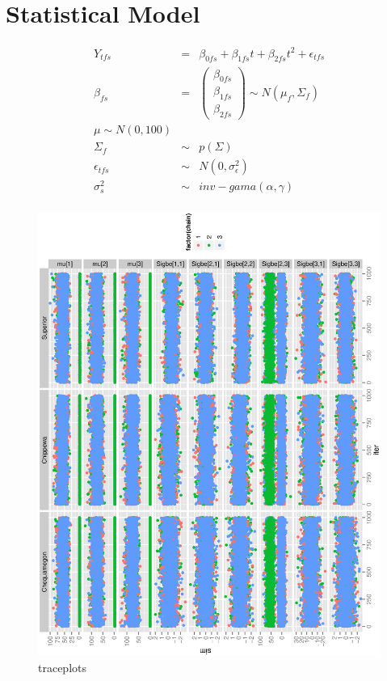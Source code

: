 \documentclass{article}
\begin{document}


\newpage

\section{Statistical Model} 



\begin{eqnarray}
\nonumber Y_{tfs} &=&  \beta_{0fs} + \beta_{1fs}t + \beta_{2fs}t^2 + \epsilon_{tfs}  \\
\nonumber \beta_{fs} &=& \left(\begin{array}{c}
    \beta_{0fs}   \\ 
    \beta_{1fs}  \\ 
    \beta_{2fs}  
\end{array}\right) \sim N(\mu_f, \Sigma_{f}) \\
\nonumber \mu \sim N(0, 100) \\
\nonumber \Sigma_{f}  &\sim& p(\Sigma) \\ 
\nonumber \epsilon_{tfs}  &\sim& N(0,\sigma_{\epsilon}^2) \\
\sigma_{s}^2  &\sim& inv-gama(\alpha,\gamma) \\
\label{mod.wish}
\end{eqnarray}






\begin{figure}[h!]
\centering
\includegraphics[scale=.6, angle=-90]{trace_wis.ps}
\caption{traceplots}
\end{figure}



\end{document}

